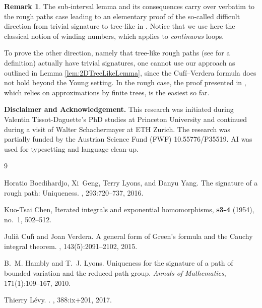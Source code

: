 \documentclass[11pt]{article}
\theoremstyle{definition}
\newtheorem{remark}[theorem]{Remark}
\begin{document}
\begin{remark}
The sub-interval lemma and its consequences carry over verbatim to the rough paths case leading to an elementary proof of the so-called difficult direction from trivial signature to tree-like in \cite{BGLY2016}. Notice that we use here the classical notion of winding numbers, which applies to  \emph{continuous} loops. 

To prove the other direction, namely that tree-like rough paths (see \cite{BGLY2016} for a definition) actually have trivial signatures, one cannot use our approach as outlined in Lemma \ref{lem:2DTreeLikeLemma}, since the Cufí--Verdera  formula  \cite[Theorem 1]{CV2015} does not hold beyond the Young setting. In the rough case, the proof presented in \cite{BGLY2016}, which relies on approximations by finite trees, is the easiest so far.
\end{remark}

\noindent \textbf{Disclaimer and Acknowledgement.} This research was initiated during Valentin Tissot-Daguette's PhD studies at Princeton University and continued during a visit of Walter Schachermayer at ETH Zurich. The research was partially funded by the Austrian Science Fund (FWF) 10.55776/P35519. AI was used for typesetting and language clean-up. 

\begin{thebibliography}{9}

Horatio Boedihardjo, Xi~Geng, Terry Lyons, and Danyu Yang.
\newblock The signature of a rough path: Uniqueness.
, 293:720--737, 2016.

Kuo-Tsai Chen,
\newblock Iterated integrals and exponential homomorphisms,
 \textbf{s3-4}
  (1954), no.~1, 502--512.


Juli{\`a} Cuf{\'\i} and Joan Verdera.
\newblock A general form of {G}reen's formula and the {C}auchy integral theorem.
, 143(5):2091--2102, 2015.

B.~M. Hambly and T.~J. Lyons.
\newblock Uniqueness for the signature of a path of bounded variation and the reduced path group.
\newblock \emph{Annals of Mathematics}, 171(1):109--167, 2010.

Thierry L{\'e}vy.
.
, 388:ix+201, 2017.

\end{thebibliography}
\end{document}
